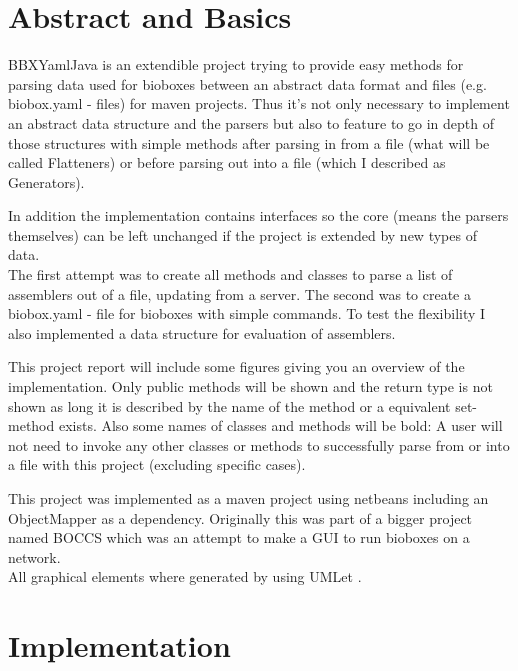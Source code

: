 \documentclass[
	twoside,
	fontsize=12pt,
	headsepline,
	cleardoublepage=empty,
	numbers=noenddot,
	bibliography=totoc,
]{scrbook}
\begin{document}


\tableofcontents

\clearpage
{}


\chapter{Abstract and Basics}

BBXYamlJava is an extendible project trying to provide easy methods for parsing data used for bioboxes between an abstract data format and files (e.g. biobox.yaml - files) for maven projects. Thus it's not only necessary to implement an abstract data structure and the parsers but also to feature to go in depth of those structures with simple methods after parsing in from a file (what will be called Flatteners) or before parsing out into a file (which I described as Generators). 

In addition the implementation contains interfaces so the core (means the parsers themselves) can be left unchanged if the project is extended by new types of data. \\
The first attempt was to create all methods and classes to parse a list of assemblers out of a file, updating from a server. The second was to create a biobox.yaml - file for bioboxes with simple commands. To test the flexibility I also implemented a data structure for evaluation of assemblers.

This project report will include some figures giving you an overview of the implementation. Only public methods will be shown and the return type is not shown as long it is described by the name of the method or a equivalent set-method exists. Also some names of classes and methods will be bold: A user will not need to invoke any other classes or methods to successfully parse from or into a file with this project (excluding specific cases).

This project \cite{BBXYamlJava} was implemented as a maven project using netbeans \cite{Netbeans} including an ObjectMapper \cite{ObjectMapper} as a dependency. Originally this was part of a bigger project named BOCCS \cite{BOCCS} which was an attempt to make a GUI to run bioboxes \cite{BioBoxes} on a network.\\
All graphical elements where generated by using UMLet \cite{Umlet}. 

\chapter{Implementation}
\end{document}
